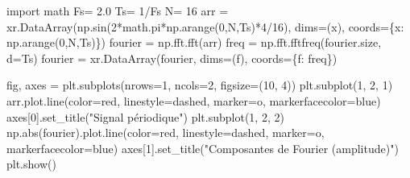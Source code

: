 \documentclass[
  11pt,
  letterpaper,
  open=any,
  twoside=false,
  french]{scrbook}
\newenvironment{Shaded}{\begin{snugshade}}{\end{snugshade}}
\newcommand{\BuiltInTok}[1]{\textcolor[rgb]{0.00,0.23,0.31}{#1}}
\newcommand{\DecValTok}[1]{\textcolor[rgb]{0.68,0.00,0.00}{#1}}
\newcommand{\FloatTok}[1]{\textcolor[rgb]{0.68,0.00,0.00}{#1}}
\newcommand{\ImportTok}[1]{\textcolor[rgb]{0.00,0.46,0.62}{#1}}
\newcommand{\NormalTok}[1]{\textcolor[rgb]{0.00,0.23,0.31}{#1}}
\newcommand{\OperatorTok}[1]{\textcolor[rgb]{0.37,0.37,0.37}{#1}}
\newcommand{\StringTok}[1]{\textcolor[rgb]{0.13,0.47,0.30}{#1}}
\begin{document}
\begin{Shaded}
\begin{Highlighting}[]
\ImportTok{import}\NormalTok{ math}
\NormalTok{Fs}\OperatorTok{=} \FloatTok{2.0}
\NormalTok{Ts}\OperatorTok{=} \DecValTok{1}\OperatorTok{/}\NormalTok{Fs}
\NormalTok{N}\OperatorTok{=} \DecValTok{16}
\NormalTok{arr }\OperatorTok{=}\NormalTok{ xr.DataArray(np.sin(}\DecValTok{2}\OperatorTok{*}\NormalTok{math.pi}\OperatorTok{*}\NormalTok{np.arange(}\DecValTok{0}\NormalTok{,N,Ts)}\OperatorTok{*}\DecValTok{4}\OperatorTok{/}\DecValTok{16}\NormalTok{),}
\NormalTok{                   dims}\OperatorTok{=}\NormalTok{(}\StringTok{\textquotesingle{}x\textquotesingle{}}\NormalTok{), coords}\OperatorTok{=}\NormalTok{\{}\StringTok{\textquotesingle{}x\textquotesingle{}}\NormalTok{: np.arange(}\DecValTok{0}\NormalTok{,N,Ts)\})}
\NormalTok{fourier }\OperatorTok{=}\NormalTok{ np.fft.fft(arr)}
\NormalTok{freq }\OperatorTok{=}\NormalTok{ np.fft.fftfreq(fourier.size, d}\OperatorTok{=}\NormalTok{Ts)}
\NormalTok{fourier }\OperatorTok{=}\NormalTok{ xr.DataArray(fourier,}
\NormalTok{                   dims}\OperatorTok{=}\NormalTok{(}\StringTok{\textquotesingle{}f\textquotesingle{}}\NormalTok{), coords}\OperatorTok{=}\NormalTok{\{}\StringTok{\textquotesingle{}f\textquotesingle{}}\NormalTok{: freq\})}

\NormalTok{fig, axes }\OperatorTok{=}\NormalTok{ plt.subplots(nrows}\OperatorTok{=}\DecValTok{1}\NormalTok{, ncols}\OperatorTok{=}\DecValTok{2}\NormalTok{, figsize}\OperatorTok{=}\NormalTok{(}\DecValTok{10}\NormalTok{, }\DecValTok{4}\NormalTok{))}
\NormalTok{plt.subplot(}\DecValTok{1}\NormalTok{, }\DecValTok{2}\NormalTok{, }\DecValTok{1}\NormalTok{)}
\NormalTok{arr.plot.line(color}\OperatorTok{=}\StringTok{\textquotesingle{}red\textquotesingle{}}\NormalTok{, linestyle}\OperatorTok{=}\StringTok{\textquotesingle{}dashed\textquotesingle{}}\NormalTok{, marker}\OperatorTok{=}\StringTok{\textquotesingle{}o\textquotesingle{}}\NormalTok{, markerfacecolor}\OperatorTok{=}\StringTok{\textquotesingle{}blue\textquotesingle{}}\NormalTok{)}
\NormalTok{axes[}\DecValTok{0}\NormalTok{].set\_title(}\StringTok{"Signal périodique"}\NormalTok{)}
\NormalTok{plt.subplot(}\DecValTok{1}\NormalTok{, }\DecValTok{2}\NormalTok{, }\DecValTok{2}\NormalTok{)}
\NormalTok{np.}\BuiltInTok{abs}\NormalTok{(fourier).plot.line(color}\OperatorTok{=}\StringTok{\textquotesingle{}red\textquotesingle{}}\NormalTok{, linestyle}\OperatorTok{=}\StringTok{\textquotesingle{}dashed\textquotesingle{}}\NormalTok{, marker}\OperatorTok{=}\StringTok{\textquotesingle{}o\textquotesingle{}}\NormalTok{, markerfacecolor}\OperatorTok{=}\StringTok{\textquotesingle{}blue\textquotesingle{}}\NormalTok{)}
\NormalTok{axes[}\DecValTok{1}\NormalTok{].set\_title(}\StringTok{"Composantes de Fourier (amplitude)"}\NormalTok{)}
\NormalTok{plt.show()}
\end{Highlighting}
\end{Shaded}
\end{document}
